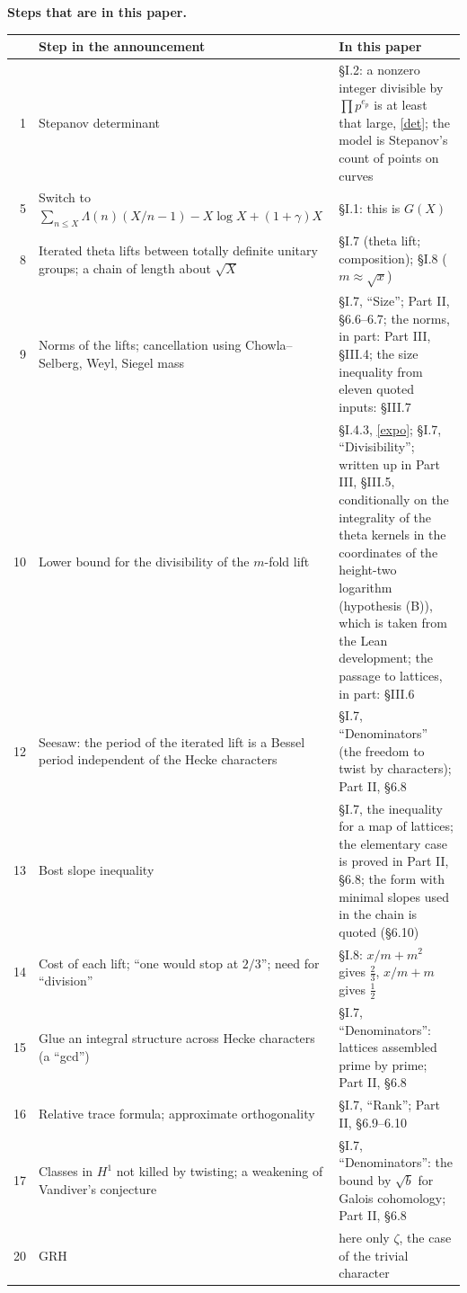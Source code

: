 \documentclass[11pt,letterpaper]{article}
\begin{document}
\textbf{Steps that are in this paper.}

\begin{center}\small
\begin{tabular}{rp{}p{}}
\toprule
 & Step in the announcement & In this paper\\
\midrule
1 & Stepanov determinant & \S I.2: a nonzero integer divisible by $\prod p^{e_p}$ is at least that large, \eqref{det}; the model is Stepanov's count of points on curves\\
5 & Switch to $\sum_{n\le X}\Lambda(n)(X/n-1)-X\log X+(1+\gamma)X$ & \S I.1: this is $G(X)$\\
8 & Iterated theta lifts between totally definite unitary groups; a chain of length about $\sqrt X$ & \S I.7 (theta lift; composition); \S I.8 ($m\approx\sqrt x$)\\
9 & Norms of the lifts; cancellation using Chowla--Selberg, Weyl, Siegel mass & \S I.7, ``Size''; Part II, \S6.6--6.7; the norms, in part: Part III, \S III.4; the size inequality from eleven quoted inputs: \S III.7\\
10 & Lower bound for the divisibility of the $m$-fold lift & \S I.4.3, \eqref{expo}; \S I.7, ``Divisibility''; written up in Part III, \S III.5, conditionally on the integrality of the theta kernels in the coordinates of the height-two logarithm (hypothesis (B)), which is taken from the Lean development; the passage to lattices, in part: \S III.6\\
12 & Seesaw: the period of the iterated lift is a Bessel period independent of the Hecke characters & \S I.7, ``Denominators'' (the freedom to twist by characters); Part II, \S6.8\\
13 & Bost slope inequality & \S I.7, the inequality for a map of lattices; the elementary case is proved in Part II, \S6.8; the form with minimal slopes used in the chain is quoted (\S6.10)\\
14 & Cost of each lift; ``one would stop at $2/3$''; need for ``division'' & \S I.8: $x/m+m^2$ gives $\frac23$, $x/m+m$ gives $\frac12$\\
15 & Glue an integral structure across Hecke characters (a ``gcd'') & \S I.7, ``Denominators'': lattices assembled prime by prime; Part II, \S6.8\\
16 & Relative trace formula; approximate orthogonality & \S I.7, ``Rank''; Part II, \S6.9--6.10\\
17 & Classes in $H^1$ not killed by twisting; a weakening of Vandiver's conjecture & \S I.7, ``Denominators'': the bound by $\sqrt b$ for Galois cohomology; Part II, \S6.8\\
20 & GRH & here only $\zeta$, the case of the trivial character\\
\bottomrule
\end{tabular}
\end{center}
\end{document}
